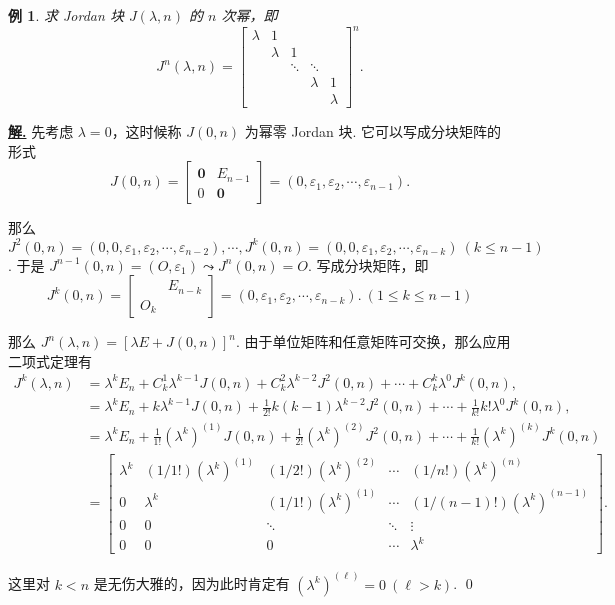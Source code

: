 \documentclass[10pt,openany]{article}
\theoremstyle{thmstyle} %
\theoremstyle{defstyle} %
\theoremstyle{prostyle} %
\theoremstyle{exastyle}
\newtheorem{example}[theorem]{例}
\theoremstyle{remstyle}
\newenvironment{solution}{\par\underline{\textbf{解.}} \;\fangsong}{\qed\par}
\begin{document}
\begin{example}
	求 Jordan 块 \( J(\lambda,n) \) 的 \( n \) 次幂，即
	\[ J^n(\lambda,n)=\begin{bmatrix}
		\lambda & 1 &  & & \\
		& \lambda & 1 & & \\
		& & \ddots & \ddots & \\
		& & & \lambda &1 \\
		& & & & \lambda
	\end{bmatrix}^n. \]
\end{example}

\begin{solution}
	先考虑 \( \lambda=0 \)，这时候称 \( J(0,n) \) 为幂零 Jordan 块. 它可以写成分块矩阵的形式
	\[ J(0,n)= \begin{bmatrix}
		\bm{0} & E_{n-1} \\ 0 & \bm{0}
	\end{bmatrix}=(0,\varepsilon_1,\varepsilon_2,\cdots,\varepsilon_{n-1}). \]
	
	那么 \( J^2(0,n)=(0,0,\varepsilon_1,\varepsilon_2,\cdots,\varepsilon_{n-2}),\cdots, J^k(0,n)=(0,0,\varepsilon_1,\varepsilon_2,\cdots,\varepsilon_{n-k}) \ (k \leq n-1) \). 于是 \( J^{n-1}(0,n)=(O,\varepsilon_1) \leadsto J^{n}(0,n)=O \). 写成分块矩阵，即
	\[ J^k(0,n)= \begin{bmatrix}
		 & E_{n-k} \\ O_k & 
	\end{bmatrix}=(0,\varepsilon_1,\varepsilon_2,\cdots,\varepsilon_{n-k}). \ (1 \leq k \leq n-1)\]
	
	那么 \( J^n(\lambda,n)=[\lambda E+J(0,n)]^n \). 由于单位矩阵和任意矩阵可交换，那么应用二项式定理有
	\begin{align*}
		J^k(\lambda,n) &=\lambda^k E_n+ C_k^1\lambda^{k-1}J(0,n)+C_k^2\lambda^{k-2}J^2(0,n)+\cdots+C_k^k\lambda^0J^k(0,n), \\
		&=\lambda^k E_n+ k\lambda^{k-1}J(0,n)+\frac{1}{2!} k(k-1)\lambda^{k-2}J^2(0,n)+\cdots+\frac{1}{k!}k!\lambda^0J^k(0,n), \\
		&=\lambda^k E_n+ \frac{1}{1!}(\lambda^k)^{(1)}J(0,n)+\frac{1}{2!} (\lambda^k)^{(2)}J^2(0,n)+\cdots+\frac{1}{k!}(\lambda^k)^{(k)}J^k(0,n) \\[2ex]
		&= \begin{bmatrix}
			\lambda^k & (1/1!)(\lambda^k)^{(1)} & (1/2!)(\lambda^k)^{(2)} & \cdots & (1/n!)(\lambda^k)^{(n)} \\
			0 & \lambda^k & (1/1!)(\lambda^k)^{(1)} & \cdots &  (1/(n-1)!)(\lambda^k)^{(n-1)} \\
			0 & 0 & \ddots & \ddots &  \vdots \\
			0 & 0 & 0 & \cdots &  \lambda^k 
		\end{bmatrix}.
	\end{align*}
   
   这里对 \( k<n \) 是无伤大雅的，因为此时肯定有 \( (\lambda^k)^{(\ell)}=0 \ ( \ell>k) \).
\end{solution}
\end{document}

